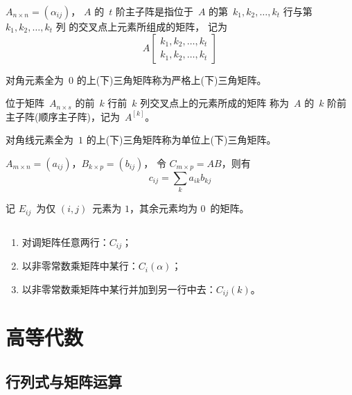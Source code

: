\documentclass[twoside,openright]{book}
\begin{document}
\begin{CJK*}{UTF8}{}
\begin{defn}
$A_{n\times n}=(\alpha_{ij})$，
$A$ 的\ $t$ 阶主子阵是指位于\ $A$ 的第\ $k_1,k_2,\dotsc,k_t$ 行与第\ $k_1,k_2,\dotsc,k_t$ 列
的交叉点上元素所组成的矩阵，
记为
\[
A\begin{bmatrix}k_1,k_2,\dotsc,k_t\\k_1,k_2,\dotsc,k_t\end{bmatrix}
\]
\end{defn}

\begin{defn}
对角元素全为\ $0$ 的上(下)三角矩阵称为严格上(下)三角矩阵。
\end{defn}

\begin{defn}
位于矩阵\ $A_{n\times s}$ 的前\ $k$ 行前\ $k$ 列交叉点上的元素所成的矩阵
称为\ $A$ 的\ $k$ 阶前主子阵(顺序主子阵)，记为\ $A^{[k]}$。
\end{defn}

\begin{defn}
对角线元素全为\ $1$ 的上(下)三角矩阵称为单位上(下)三角矩阵。
\end{defn}

\begin{defn}
$A_{m\times n}=(a_{ij})$，$B_{k\times p}=(b_{ij})$，
令 $C_{m\times p}=AB$，则有
\[
c_{ij} = \sum_{k} a_{ik} b_{kj}
\]
\end{defn}

\begin{defn}
记 $E_{ij}$\ 为仅 $(i,j)$\ 元素为 $1$，其余元素均为 $0$\ 的矩阵。
\end{defn}

\begin{defn}[初等变换]
$ $

\begin{enumerate}
\item
对调矩阵任意两行：$C_{ij}$；
\item
以非零常数乘矩阵中某行：$C_i(\alpha)$；
\item
以非零常数乘矩阵中某行并加到另一行中去：$C_{ij}(k)$。
\end{enumerate}

\end{defn}

\chapter{高等代数}
\section{行列式与矩阵运算}


\end{CJK*}
\end{document}
